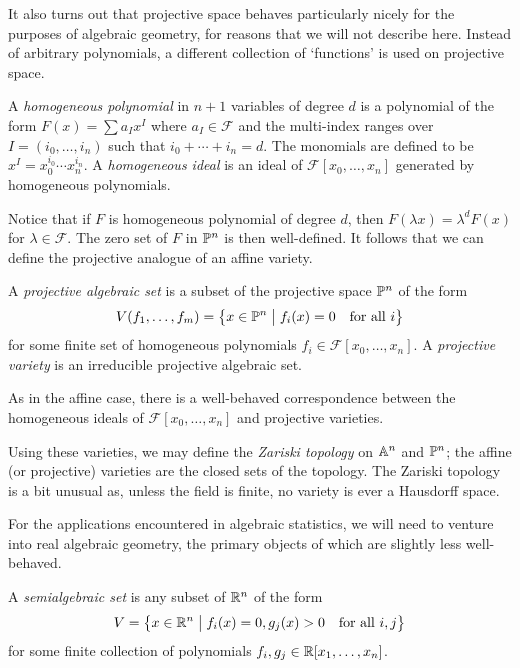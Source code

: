 \documentclass[cclicense]{hmcthesis}
\newcommand*{\F}{\mathcal{F}}
\newcommand*{\vbar}{\;\big\vert\;}
\numberwithin{equation}{chapter}
\numberwithin{thmcounter}{chapter}
\begin{document}
    It also turns out that projective space behaves particularly nicely for the
    purposes of algebraic geometry, for reasons that we will not describe here.
    Instead of arbitrary polynomials, a different collection of `functions' is
    used on projective space.
    \begin{definition}
        A \emph{homogeneous polynomial} in $n+1$ variables of degree $d$ is a
        polynomial of the form $F(x) = \sum a_I x^I$ where $a_I \in \F$ and the
        multi-index ranges over $I = (i_0, \ldots, i_n)$ such that $i_0 + \cdots
        + i_n = d$.  The monomials are defined to be $x^I = x_0^{i_0}\cdots
        x_n^{i_n}$.  A \emph{homogeneous ideal} is an ideal of $\F[x_0, \ldots,
        x_n]$ generated by homogeneous polynomials.
    \end{definition}
    Notice that if $F$ is homogeneous polynomial of degree $d$, then $F(\lambda
    x) = \lambda^d F(x)$ for $\lambda \in \F$.  The zero set of $F$ in $\mathbb{P}^n$
    is then well-defined.  It follows that we can define the projective analogue
    of an affine variety.
    \begin{definition}
        A \emph{projective algebraic set} is a subset of the projective space
        $\mathbb{P}^n$ of the form
        \[
            V(f_1, \ldots, f_m)
            = \cdel[\big]{x \in \Proj^n \vbar f_i(x) = 0 \quad\text{for all $i$}}
        \]
        for some finite set of homogeneous polynomials $f_i \in \F[x_0,
        \ldots,x_n]$.  A \emph{projective variety} is an irreducible projective
        algebraic set.
    \end{definition}
    As in the affine case, there is a well-behaved correspondence between the
    homogeneous ideals of $\F[x_0, \ldots, x_n]$ and projective varieties.

    Using these varieties, we may define the \emph{Zariski topology} on $\mathbb{A}^n$
    and $\mathbb{P}^n$;  the affine (or projective) varieties are the closed sets of
    the topology.  The Zariski topology is a bit unusual as, unless the field is
    finite, no variety is ever a Hausdorff space.

    For the applications encountered in algebraic statistics, we will need to
    venture into real algebraic geometry, the primary objects of which are
    slightly less well-behaved.
    \begin{definition}
        A \emph{semialgebraic set} is any subset of $\mathbb{R}^n$ of the form
        \[
            V = \cdel[\big]{ x \in \R^n \vbar
                f_i(x) = 0, g_j(x) > 0
            \quad\text{for all $i,j$}}
        \]
        for some finite collection of polynomials $f_i, g_j \in \mathbb{R}[x_1, \ldots,
        x_n]$.
    \end{definition}
\end{document}
